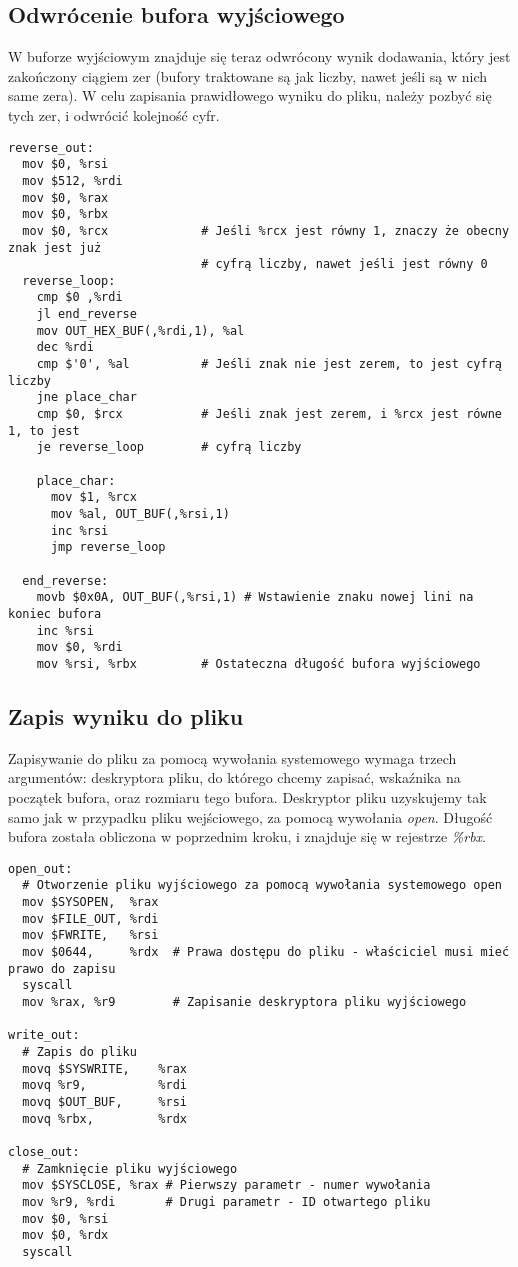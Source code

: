 \documentclass[11pt]{report}
\begin{document}
\subsection{Odwrócenie bufora wyjściowego}
W buforze wyjściowym znajduje się teraz odwrócony wynik dodawania, który jest zakończony ciągiem zer (bufory traktowane są jak liczby, nawet jeśli są w nich same zera). W celu zapisania prawidłowego wyniku do pliku, należy pozbyć się tych zer, i odwrócić kolejność cyfr.
\begin{verbatim}
reverse_out:
  mov $0, %rsi             
  mov $512, %rdi
  mov $0, %rax
  mov $0, %rbx
  mov $0, %rcx             # Jeśli %rcx jest równy 1, znaczy że obecny znak jest już 
                           # cyfrą liczby, nawet jeśli jest równy 0
  reverse_loop:
    cmp $0 ,%rdi
    jl end_reverse
    mov OUT_HEX_BUF(,%rdi,1), %al
    dec %rdi
    cmp $'0', %al          # Jeśli znak nie jest zerem, to jest cyfrą liczby
    jne place_char
    cmp $0, $rcx           # Jeśli znak jest zerem, i %rcx jest równe 1, to jest
    je reverse_loop        # cyfrą liczby
    
    place_char:
      mov $1, %rcx
      mov %al, OUT_BUF(,%rsi,1)
      inc %rsi
      jmp reverse_loop
      
  end_reverse:
    movb $0x0A, OUT_BUF(,%rsi,1) # Wstawienie znaku nowej lini na koniec bufora
    inc %rsi
    mov $0, %rdi
    mov %rsi, %rbx         # Ostateczna długość bufora wyjściowego

\end{verbatim}
\newpage
\subsection{Zapis wyniku do pliku}
Zapisywanie do pliku za pomocą wywołania systemowego wymaga trzech argumentów: deskryptora pliku, do którego chcemy zapisać, wskaźnika na początek bufora, oraz rozmiaru tego bufora.
Deskryptor pliku uzyskujemy tak samo jak w przypadku pliku wejściowego, za pomocą wywołania \textit{open}. Długość bufora została obliczona w poprzednim kroku, i znajduje się w rejestrze \textit{\%rbx}.
\begin{verbatim}
open_out:
  # Otworzenie pliku wyjściowego za pomocą wywołania systemowego open
  mov $SYSOPEN,  %rax
  mov $FILE_OUT, %rdi 
  mov $FWRITE,   %rsi 
  mov $0644,     %rdx  # Prawa dostępu do pliku - właściciel musi mieć prawo do zapisu
  syscall
  mov %rax, %r9        # Zapisanie deskryptora pliku wyjściowego
  
write_out:
  # Zapis do pliku
  movq $SYSWRITE,    %rax
  movq %r9,          %rdi
  movq $OUT_BUF,     %rsi
  movq %rbx,         %rdx
  
close_out:
  # Zamknięcie pliku wyjściowego
  mov $SYSCLOSE, %rax # Pierwszy parametr - numer wywołania
  mov %r9, %rdi       # Drugi parametr - ID otwartego pliku
  mov $0, %rsi
  mov $0, %rdx
  syscall
\end{verbatim}
\end{document}
